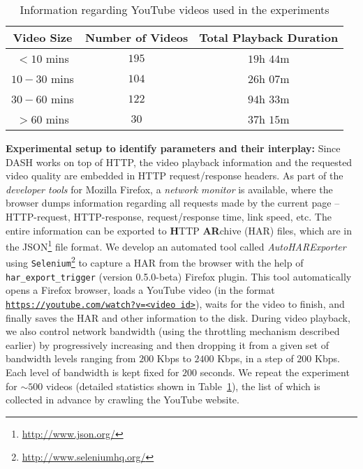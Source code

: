 \begin{table}[!t]
 \small
 \centering
 \caption{\small{Information regarding YouTube videos used in the experiments}}
 \label{table:chap03:statvid}
 \begin{tabular}{|c|c|c|}
  \hline 
  \textbf{Video Size} & \textbf{Number of Videos} & \textbf{Total Playback Duration} \\
  \hline \hline 
  $<10$ mins & $195$ & $19$h $44$m \\
  \hline 
  $10-30$ mins & $104$ & $26$h $07$m \\
  \hline 
  $30-60$ mins & $122$ & $94$h $33$m \\
  \hline 
  $>60$ mins & $30$ & $37$h $15$m \\
  \hline 
 \end{tabular}
\end{table}
{\bf Experimental setup to identify parameters and their interplay:} Since DASH works on top of HTTP, the video playback information and the requested video quality are embedded in HTTP request/response headers.
As part of the {\em developer tools} for Mozilla Firefox, a {\em network monitor} is available, where the browser dumps information regarding all requests made by the current page -- HTTP-request, HTTP-response, request/response time, link speed, etc.
The entire information can be exported to {\bf H}TTP {\bf AR}chive (HAR) files, which are in the JSON\footnote{\url{http://www.json.org/}} file format.
We develop an automated tool called {\em AutoHARExporter} using \texttt{Selenium}\footnote{\url{http://www.seleniumhq.org/}} to capture a HAR from the browser with the help of \texttt{har\_export\_trigger} (version 0.5.0-beta) Firefox plugin.
This tool automatically opens a Firefox browser, loads a YouTube video (in the format {\tt \url{https://youtube.com/watch?v=<video id>}}), waits for the video to finish, and finally saves the HAR and other information to the disk.
During video playback, we also control network bandwidth (using the throttling mechanism described earlier) by progressively increasing and then dropping it from a given set of bandwidth levels ranging from $200$ Kbps to $2400$ Kbps, in a step of $200$ Kbps.
Each level of bandwidth is kept fixed for $200$ seconds. 
We repeat the experiment for $\sim500$ videos (detailed statistics shown in Table~\ref{table:chap03:statvid}), the list of which is collected in advance by crawling the YouTube website.

